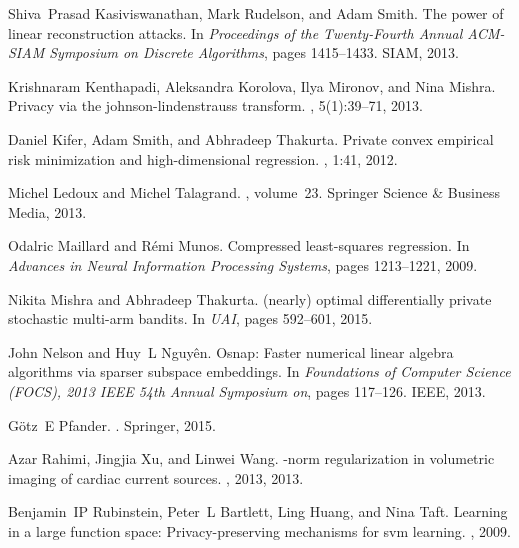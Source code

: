 \documentclass{article}
\theoremstyle{plain}
\begin{document}
\begin{thebibliography}{10}
Shiva~Prasad Kasiviswanathan, Mark Rudelson, and Adam Smith.
\newblock The power of linear reconstruction attacks.
\newblock In {\em Proceedings of the Twenty-Fourth Annual ACM-SIAM Symposium on
  Discrete Algorithms}, pages 1415--1433. SIAM, 2013.

Krishnaram Kenthapadi, Aleksandra Korolova, Ilya Mironov, and Nina Mishra.
\newblock Privacy via the johnson-lindenstrauss transform.
, 5(1):39--71, 2013.

Daniel Kifer, Adam Smith, and Abhradeep Thakurta.
\newblock Private convex empirical risk minimization and high-dimensional
  regression.
, 1:41, 2012.

Michel Ledoux and Michel Talagrand.
,
  volume~23.
\newblock Springer Science \& Business Media, 2013.

Odalric Maillard and R{\'e}mi Munos.
\newblock Compressed least-squares regression.
\newblock In {\em Advances in Neural Information Processing Systems}, pages
  1213--1221, 2009.

Nikita Mishra and Abhradeep Thakurta.
\newblock (nearly) optimal differentially private stochastic multi-arm bandits.
\newblock In {\em UAI}, pages 592--601, 2015.

John Nelson and Huy~L Nguy{\^e}n.
\newblock Osnap: Faster numerical linear algebra algorithms via sparser
  subspace embeddings.
\newblock In {\em Foundations of Computer Science (FOCS), 2013 IEEE 54th Annual
  Symposium on}, pages 117--126. IEEE, 2013.

G{\"o}tz~E Pfander.
.
\newblock Springer, 2015.

Azar Rahimi, Jingjia Xu, and Linwei Wang.
\newblock -norm regularization in volumetric imaging of cardiac current
  sources.
, 2013, 2013.

Benjamin~IP Rubinstein, Peter~L Bartlett, Ling Huang, and Nina Taft.
\newblock Learning in a large function space: Privacy-preserving mechanisms for
  svm learning.
, 2009.


\end{thebibliography}
\end{document}
